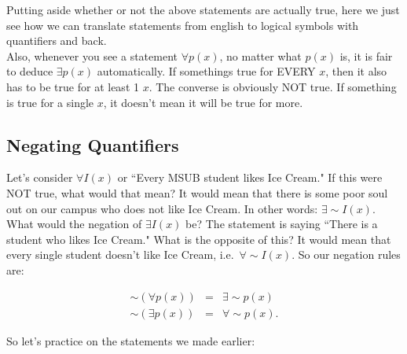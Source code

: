 Putting aside whether or not the above statements are actually true, here we just see how we can translate statements from english to logical symbols with quantifiers and back.\\

Also, whenever you see a statement $\forall p(x)$, no matter what $p(x)$ is, it is fair to deduce $\exists p(x)$ automatically.  If somethings true for EVERY $x$, then it also has to be true for at least 1 $x$.  The converse is obviously NOT true.  If something is true for a single $x$, it doesn't mean it will be true for more.


\subsection{Negating Quantifiers}

Let's consider $\forall I(x)$ or ``Every MSUB student likes Ice Cream."   If this were NOT true, what would that mean?  It would mean that there is some poor soul out on our campus who does not like Ice Cream.  In other words: $\exists \sim I(x)$.\\

What would the negation of $\exists I(x)$ be?  The statement is saying ``There is a student who likes Ice Cream."  What is the opposite of this?  It would mean that every single student doesn't like Ice Cream, i.e.\ $\forall \sim I(x)$.  So our negation rules are:

\begin{eqnarray*}
\sim(\forall p(x))&=&\exists \sim p(x)\\
\sim(\exists p(x))&=&\forall \sim p(x).
\end{eqnarray*}

So let's practice on the statements we made earlier:

